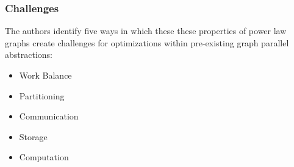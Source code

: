 \begin{frame}
  \frametitle{Challenges}
  The authors identify five ways in which these these properties of power law
  graphs create challenges for optimizations within pre-existing graph parallel
  abstractions:
  \begin{itemize}
    \item Work Balance
    \item Partitioning
    \item Communication
    \item Storage
    \item Computation
  \end{itemize}
\end{frame}
